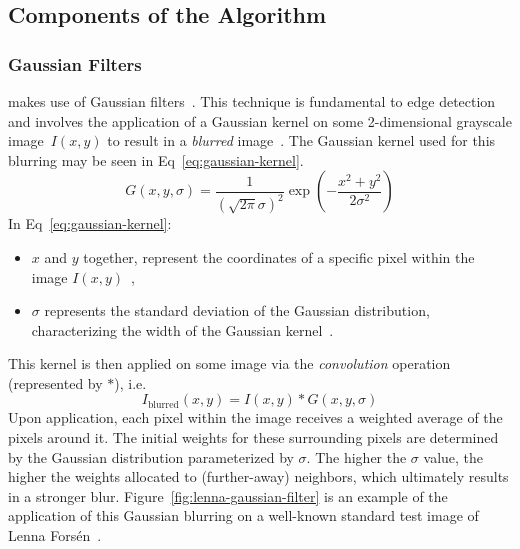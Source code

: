 \subsection{Components of the \blobdog{} Algorithm}
\subsubsection{\label{sec:gaussian-filters}Gaussian Filters}

\blobdog{} makes use of Gaussian filters~\cite{Lowe2004}. This technique is
fundamental to edge detection and involves the application of a Gaussian kernel
on some 2-dimensional grayscale image~$I(x, y)$ to result in a
\textit{blurred} image~\cite{gaussianKernel}. The Gaussian kernel used for this
blurring may be seen in Eq~\eqref{eq:gaussian-kernel}.
\begin{equation}
    G(x,y, \sigma) = \frac{1}{(\sqrt{2\pi}\sigma)^{2}} \exp\left(-\frac{x^{2} + y^{2}}{2\sigma^{2}}\right)
    \label{eq:gaussian-kernel}
\end{equation}
In Eq~\eqref{eq:gaussian-kernel}:
\begin{itemize}
    \item $x$ and $y$ together, represent the coordinates of a specific pixel within the image $I(x, y)$~\cite{molecularDoG},
    \item $\sigma$ represents the standard deviation of the Gaussian distribution, characterizing the width of the Gaussian kernel~\cite{molecularDoG}.
\end{itemize}
This kernel is then applied on some image
via the \textit{convolution} operation (represented by $*$), i.e.
\begin{equation*}
    I_{\text{blurred}}(x, y) = I(x, y) * G(x, y, \sigma)
\end{equation*}
Upon application, each pixel within the
image receives a weighted average of the pixels around it. The initial weights
for these surrounding pixels are determined by the Gaussian distribution
parameterized by $\sigma$. The higher the $\sigma$ value, the higher the weights allocated
to (further-away) neighbors, which ultimately results in a stronger blur.
Figure~\ref{fig:lenna-gaussian-filter} is an example of the application of this
Gaussian blurring on a well-known standard test image of Lenna Forsén~\cite{wikimedia-lenna}.

